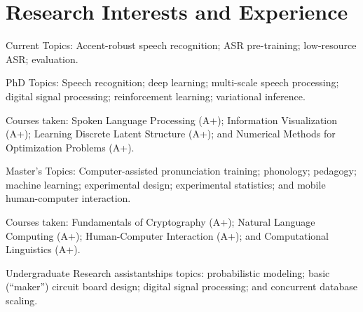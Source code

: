 \documentclass{article}
\begin{document}
\section{Research Interests and Experience}
\begin{CV}
  \item[Current] Topics: Accent-robust speech recognition; ASR pre-training;
    low-resource ASR; evaluation.

  \item[PhD] Topics: Speech recognition; deep learning; multi-scale
    speech processing; digital signal processing; reinforcement learning;
    variational inference.

    Courses taken: Spoken Language Processing (A+);
    Information Visualization (A+);
    Learning Discrete Latent Structure (A+);
    and Numerical Methods for Optimization Problems (A+).

  \item[Master's] Topics: Computer-assisted pronunciation training;
    phonology; pedagogy; machine learning; experimental design; experimental
    statistics; and mobile human-computer interaction.

    Courses taken: Fundamentals of Cryptography (A+); Natural Language
    Computing (A+); Human-Computer Interaction (A+); and Computational
    Linguistics (A+).

  \item[Undergraduate] Research assistantships topics: probabilistic modeling;
    basic (``maker'') circuit board design; digital signal processing; and
    concurrent database scaling.

\end{CV}
\end{document}

